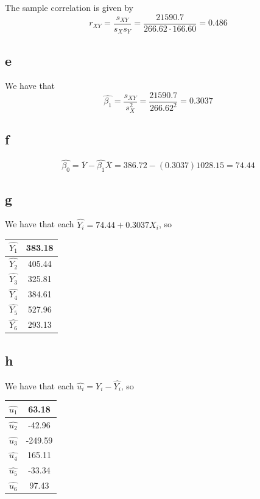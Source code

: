 \documentclass[12pt,letterpaper]{article}
\theoremstyle{definition}
\begin{document}
The sample correlation is given by
\[
  r_{XY} = \frac{s_{XY}}{s_{X}s_{Y}} = \frac{21590.7}{266.62 \cdot 166.60} = 0.486
\]

\subsection*{e}

We have that
\[
  \widehat{\beta_{1}} = \frac{s_{XY}}{s^{2}_{X}} = \frac{21590.7}{266.62^{2}} = 0.3037
\]

\subsection*{f}

\[
  \widehat{\beta_{0}} = \overline{Y} - \widehat{\beta_{1}}\overline{X} = 386.72 - (0.3037)1028.15 = 74.44
\]
\subsection*{g}

We have that each $\widehat{Y_{i}} = 74.44 +  0.3037X_{i}$, so

\begin{center}
  \begin{tabular}{c|c}
    $\widehat{Y_{1}}$ & 383.18 \\ \hline
    $\widehat{Y_{2}}$ & 405.44 \\ \hline
    $\widehat{Y_{3}}$ & 325.81 \\ \hline
    $\widehat{Y_{4}}$ & 384.61 \\ \hline
    $\widehat{Y_{5}}$ & 527.96 \\ \hline
    $\widehat{Y_{6}}$ & 293.13 \\
  \end{tabular}
\end{center}


\subsection*{h}

We have that each $\widehat{u_{i}} = Y_{i} - \widehat{Y_{i}}$, so

\begin{center}
  \begin{tabular}{c|c}
    $\widehat{u_{1}}$ & 63.18 \\ \hline
    $\widehat{u_{2}}$ & -42.96 \\ \hline
    $\widehat{u_{3}}$ & -249.59 \\ \hline
    $\widehat{u_{4}}$ & 165.11 \\ \hline
    $\widehat{u_{5}}$ & -33.34 \\ \hline
    $\widehat{u_{6}}$ & 97.43 \\
  \end{tabular}
\end{center}
\end{document}
